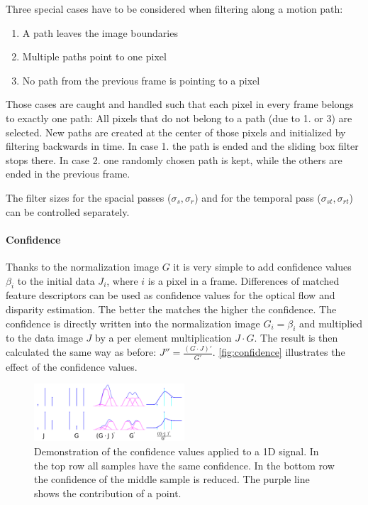 Three special cases have to be considered when filtering along a motion path:
\begin{enumerate}
  \item A path leaves the image boundaries
  \item Multiple paths point to one pixel
  \item No path from the previous frame is pointing to a pixel 
\end{enumerate}
Those cases are caught and handled such that each pixel in every frame belongs
to exactly one path: All pixels that do not belong to a path (due to 1. or 3)
are selected. New paths are created at the center of those pixels and
initialized by filtering backwards in time. In case 1. the path is ended and the
sliding box filter stops there. In case 2. one randomly chosen path is kept,
while the others are ended in the previous frame.

The filter sizes for the spacial passes ($\sigma_s, \sigma_r$) and for the
temporal pass ($\sigma_{st}, \sigma_{rt}$) can be controlled separately.

\paragraph{Confidence} \label{confidence}
Thanks to the normalization image $G$ it is very simple to add confidence values
$\beta_i$ to the initial data $J_i$, where $i$ is a pixel in a frame.
Differences of matched feature descriptors can be used as confidence values for
the optical flow and disparity estimation. The better the matches the higher the
confidence. The confidence is directly written into the normalization image $G_i
= \beta_i$ and multiplied to the data image $J$ by a per element multiplication
$J \cdot G$.  The result is then calculated the same way as before: $J'' =
\frac{(G\cdot J)'}{G'}$. \autoref{fig:confidence} illustrates the effect of the
confidence values.

\begin{figure}[htb]
  \centering
  \includegraphics[width=0.5\textwidth]{images/confidence.png}
  \caption{Demonstration of the confidence values applied to a 1D signal. In the
    top row all samples have the same confidence. In the bottom row the
    confidence of the middle sample is reduced. The
    purple line shows the contribution of a point.}
  \label{fig:confidence}
\end{figure}

